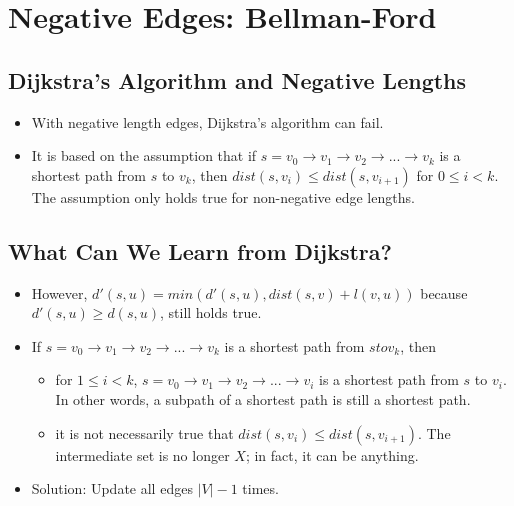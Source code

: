 \documentclass[12pt]{article}
\date{April 1, 2021}
\begin{document}
\maketitle

\section{Negative Edges: Bellman-Ford}

\subsection{Dijkstra's Algorithm and Negative Lengths}
\begin{itemize}
    \item With negative length edges, Dijkstra's algorithm can fail.
    \item It is based on the assumption that if $s = v_0 \rightarrow v_1 \rightarrow v_2  \rightarrow ... \rightarrow v_k$ is a shortest path from $s$ to $v_k$, then $dist(s, v_i) \leq dist(s, v_{i + 1})$ for $0 \leq i < k$. The assumption only holds true for non-negative edge lengths.
\end{itemize}

\subsection{What Can We Learn from Dijkstra?}
\begin{itemize}
    \item However, $d'(s, u) = min(d'(s, u), dist(s, v) + l(v, u))$ because $d'(s, u) \geq d(s, u)$, still holds true.
    \item If $s = v_0 \rightarrow v_1 \rightarrow v_2 \rightarrow ... \rightarrow v_k$ is a shortest path from $s to v_k$, then
    \begin{itemize}
        \item for $1 \leq i < k$, $s = v_0 \rightarrow v_1 \rightarrow v_2 \rightarrow ... \rightarrow v_i$ is a shortest path from $s$ to $v_i$. In other words, a subpath of a shortest path is still a shortest path.
        \item it is not necessarily true that $dist(s, v_i) \leq dist(s, v_{i + 1})$. The intermediate set is no longer $X$; in fact, it can be anything.
    \end{itemize}
    \item Solution: Update all edges $\left|V\right| - 1$ times.
\end{itemize}
\end{document}

